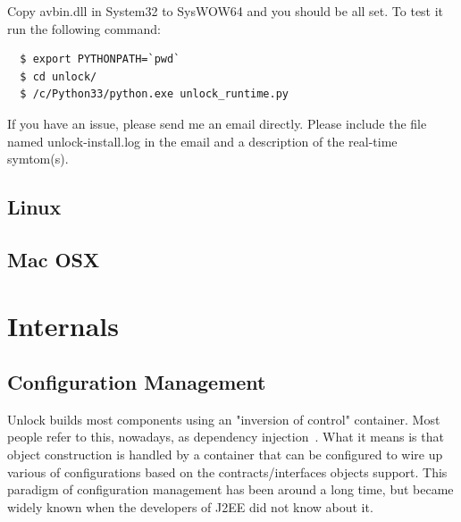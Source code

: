 \documentclass[11pt]{article}
\begin{document}
 Copy avbin.dll in System32 to SysWOW64 and you should be all set.  To test it run the following command:

\begin{verbatim}
  $ export PYTHONPATH=`pwd`
  $ cd unlock/
  $ /c/Python33/python.exe unlock_runtime.py
\end{verbatim} 

If you have an issue, please send me an email directly.  Please include the file named unlock-install.log in the email and a description of the real-time symtom(s).  
 
\subsection{Linux}
\subsection{Mac OSX}
\section{Internals}

\subsection{Configuration Management}
 Unlock builds most components using an "inversion of control" container.  Most people refer to this, nowadays, as dependency injection~\cite{depinjection}.  What it means is that object construction is handled by a container that can be configured to wire up various of configurations based on the contracts/interfaces objects support.  This paradigm of configuration management has been around a long time, but became widely known when the developers of J2EE did not know about it.
\end{document}
